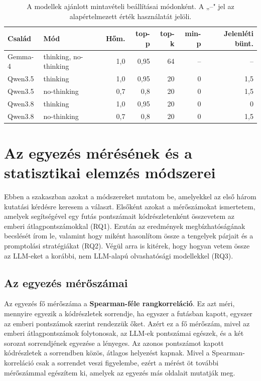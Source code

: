 \documentclass[
]{elteikthesis}[2024/04/26]
\begin{document}
\begin{table}[htb]
	\centering
	\small
	\begin{tabular}{ | l | l | r | r | r | r | r | }
		\hline
		\textbf{Család} & \textbf{Mód} & \textbf{Hőm.} & \textbf{top-p} &
		\textbf{top-k} & \textbf{min-p} & \textbf{Jelenléti bünt.} \\
		\hline \hline
		Gemma-4 & thinking, no-thinking & 1,0 & 0,95 & 64 & -- & -- \\
		\hline
		Qwen3.5 & thinking & 1,0 & 0,95 & 20 & 0 & 1,5 \\
		\hline
		Qwen3.5 & no-thinking & 0,7 & 0,8 & 20 & 0 & 1,5 \\
		\hline
		Qwen3.8 & thinking & 1,0 & 0,95 & 20 & 0 & 0 \\
		\hline
		Qwen3.8 & no-thinking & 0,7 & 0,8 & 20 & 0 & 1,5 \\
		\hline
	\end{tabular}
	\caption[A modellek ajánlott mintavételi beállításai]{A modellek ajánlott
	mintavételi beállításai módonként. A „--" jel az alapértelmezett érték
	használatát jelöli.}
	\label{tab:method:sampling}
\end{table}

\section{Az egyezés mérésének és a statisztikai elemzés módszerei}
\label{sec:method:statistics}

Ebben a szakaszban azokat a módszereket mutatom be, amelyekkel az első három %
kutatási kérdésre keresem a választ. Elsőként azokat a mérőszámokat ismertetem,
amelyek segítségével egy futás pontszámait kódrészletenként összevetem az emberi
átlagpontszámokkal (RQ1). Ezután az eredmények megbízhatóságának becslését írom
le, valamint hogy miként hasonlítom össze a tengelyek párjait és a promptolási
stratégiákat (RQ2). Végül arra is kitérek, hogy hogyan vetem össze az LLM-eket a
korábbi, nem LLM-alapú olvashatósági modellekkel (RQ3).

\subsection{Az egyezés mérőszámai}

Az egyezés fő mérőszáma a \textbf{Spearman-féle rangkorreláció}. Ez azt méri,
mennyire egyezik a kódrészletek sorrendje, ha egyszer a futásban kapott, egyszer
az emberi pontszámok szerint rendezzük őket. Azért ez a fő mérőszám, mivel az
emberi átlagpontszámok folytonosak, az LLM-ek pontszámai egészek, és a két
sorozat sorrendjének egyezése a lényeges. Az azonos pontszámot kapott
kódrészletek a sorrendben közös, átlagos helyezést kapnak. Mivel a
Spearman-korreláció csak a sorrendet veszi figyelembe, ezért a mérést öt további
mérőszámmal egészítem ki, amelyek az egyezés más oldalait mutatják meg.
\end{document}
